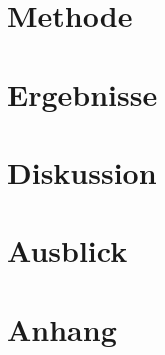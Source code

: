 \documentclass[12pt,oneside, DIV11]{scrbook}
\begin{document}
\chapter{Methode}

\chapter{Ergebnisse}

\chapter{Diskussion}

\chapter{Ausblick}



\appendix 



\backmatter	

\printbibliography[heading=bibintoc]

\chapter{Anhang}

\end{document}
